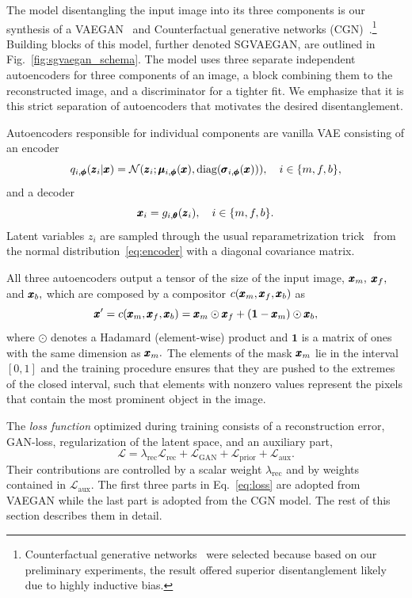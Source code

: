 The model disentangling the input image into its three components is our synthesis of a VAEGAN~\cite{larsen2016autoencoding} and Counterfactual generative networks (CGN)~\cite{sauer2021counterfactual}.\footnote{Counterfactual generative networks~\cite{sauer2021counterfactual} were selected because based on our preliminary experiments, the result offered superior disentanglement likely due to highly inductive bias.} Building blocks of this model, further denoted SGVAEGAN, are outlined in Fig.~\ref{fig:sgvaegan_schema}. The model uses three separate independent autoencoders for three components of an image, a block combining them to the reconstructed image, and a discriminator for a tighter fit. We emphasize that it is this strict separation of autoencoders that motivates the desired disentanglement.

Autoencoders responsible for individual components are vanilla VAE consisting of an encoder
\begin{equation} \label{eq:encoder}
    q_{i,\vc{\phi}}(\vc{z}_i \vert \vc{x}) = \mathcal{N} \left(\vc{z}_i; \vc{\mu}_{i,\vc{\phi}}(\vc{x}), \text{diag}(\vc{\sigma}_{i,\vc{\phi}}(\vc{x})) \right), \quad i \in \lbrace m, f, b \rbrace,
\end{equation}
 and a decoder 
\begin{equation} \label{eq:decoder}
    \pmb{{x}}_i = g_{i,\pmb{{\theta}}} (\pmb{{z}}_i),\quad i \in \lbrace m, f, b \rbrace.
\end{equation}
Latent variables $z_i$ are sampled through the usual reparametrization trick~\cite{kingma2013vae} from the normal distribution~\eqref{eq:encoder} with a diagonal covariance matrix.

All three autoencoders output a tensor of the size of the input image, $\pmb{{x}}_m,$ $\pmb{{x}}_f,$ and $\pmb{{x}}_b,$ which are composed by a compositor $c(\pmb{{x}}_m,\pmb{{x}}_f,\pmb{{x}}_b)$ as
\begin{equation}
    \pmb{{x}}' = c(\pmb{{x}}_m,\pmb{{x}}_f,\pmb{{x}}_b) = \pmb{{x}}_m \odot \pmb{{x}}_f + (\mathbf{1} - \pmb{{x}}_m) \odot \pmb{{x}}_b, \label{eq:composition}
\end{equation}
where $\odot$ denotes a Hadamard (element-wise) product and $\mathbf{1}$ is a matrix of ones with the same dimension as $\pmb{{x}}_m.$ The elements of the mask $\pmb{{x}}_m$ lie in the interval $[0,1]$ and the training procedure ensures that they are pushed to the extremes of the closed interval, such that elements with nonzero values represent the pixels that contain the most prominent object in the image. 

The \emph{loss function} optimized during training consists of a reconstruction error, GAN-loss, regularization of the latent space, and an auxiliary part, 
\begin{equation}
    \mathcal{L} = \lambda_{\text{rec}}\mathcal{L}_{\text{rec}} + \mathcal{L}_{\text{GAN}} +  \mathcal{L}_{\text{prior}} + \mathcal{L}_{\text{aux}}.
    \label{eq:loss}
\end{equation}
Their contributions are controlled by a scalar weight $\lambda_{\text{rec}}$ and by weights contained in $\mathcal{L}_{\text{aux}}.$ The first three parts in Eq.~\eqref{eq:loss} are adopted from VAEGAN while the last part is adopted from the CGN model. The rest of this section describes them in detail.

